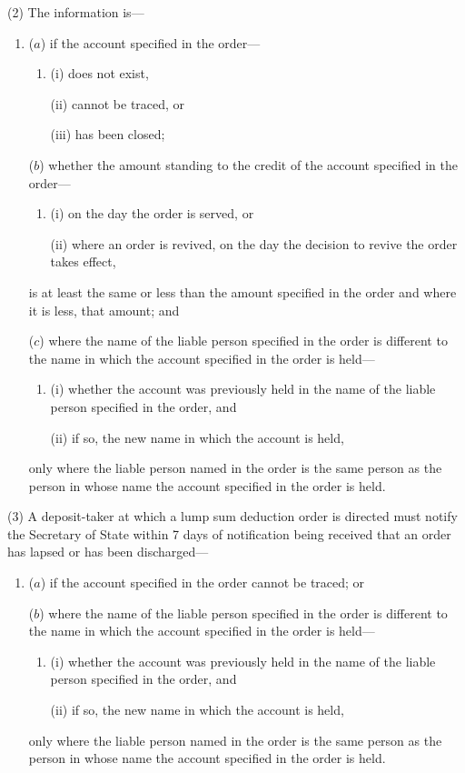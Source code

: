 \documentclass[12pt,a4paper]{article}
\begin{document}
(2) The information is—
\begin{enumerate}\item[]
($a$) if the account specified in the order—
\begin{enumerate}\item[]
(i) does not exist,

(ii) cannot be traced, or

(iii) has been closed;
\end{enumerate}

($b$) whether the amount standing to the credit of the account specified in the order—
\begin{enumerate}\item[]
(i) on the day the order is served, or

(ii) where an order is revived, on the day the decision to revive the order takes effect,
\end{enumerate}
is at least the same or less than the amount specified in the order and where it is less, that amount; and

($c$) where the name of the liable person specified in the order is different to the name in which the account specified in the order is held—
\begin{enumerate}\item[]
(i) whether the account was previously held in the name of the liable person specified in the order, and

(ii) if so, the new name in which the account is held,
\end{enumerate}
only where the liable person named in the order is the same person as the person in whose name the account specified in the order is held.
\end{enumerate}

(3) A deposit-taker at which a lump sum deduction order is directed must notify the 
Secretary of State  %
within 7 days of notification being received that an order has lapsed or has been discharged—
\begin{enumerate}\item[]
($a$) if the account specified in the order cannot be traced; or

($b$) where the name of the liable person specified in the order is different to the name in which the account specified in the order is held—
\begin{enumerate}\item[]
(i) whether the account was previously held in the name of the liable person specified in the order, and

(ii) if so, the new name in which the account is held,
\end{enumerate}
only where the liable person named in the order is the same person as the person in whose name the account specified in the order is held.
\end{enumerate}
\end{document}
